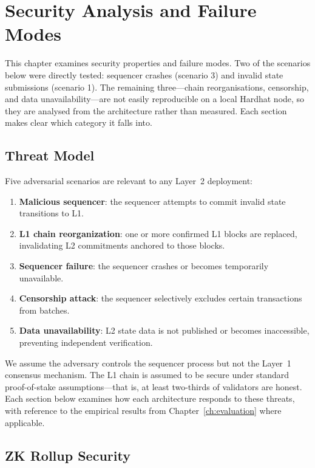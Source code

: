 \chapter{Security Analysis and Failure Modes}
\label{ch:security}

This chapter examines security properties and failure modes. Two of the scenarios below were directly tested: sequencer crashes (scenario 3) and invalid state submissions (scenario 1). The remaining three---chain reorganisations, censorship, and data unavailability---are not easily reproducible on a local Hardhat node, so they are analysed from the architecture rather than measured. Each section makes clear which category it falls into.

\section{Threat Model}

Five adversarial scenarios are relevant to any Layer~2 deployment:

\begin{enumerate}
    \item \textbf{Malicious sequencer}: the sequencer attempts to commit invalid state transitions to L1.
    \item \textbf{L1 chain reorganization}: one or more confirmed L1 blocks are replaced, invalidating L2 commitments anchored to those blocks.
    \item \textbf{Sequencer failure}: the sequencer crashes or becomes temporarily unavailable.
    \item \textbf{Censorship attack}: the sequencer selectively excludes certain transactions from batches.
    \item \textbf{Data unavailability}: L2 state data is not published or becomes inaccessible, preventing independent verification.
\end{enumerate}

We assume the adversary controls the sequencer process but not the Layer~1 consensus mechanism. The L1 chain is assumed to be secure under standard proof-of-stake assumptions---that is, at least two-thirds of validators are honest. Each section below examines how each architecture responds to these threats, with reference to the empirical results from Chapter~\ref{ch:evaluation} where applicable.

\section{ZK Rollup Security}

